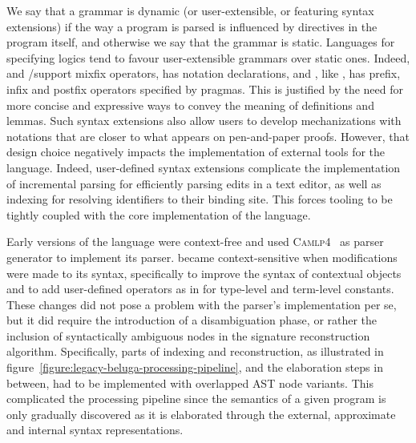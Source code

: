 We say that a grammar is dynamic (or user-extensible, or featuring syntax extensions) if the way a program is parsed is influenced by directives in the program itself, and otherwise we say that the grammar is static.
Languages for specifying logics tend to favour user-extensible grammars over static ones.
Indeed, \Agda and \Isabelle/\HOL support mixfix operators, \Coq has notation declarations, and \Beluga, like \Twelf, has prefix, infix and postfix operators specified by pragmas.
This is justified by the need for more concise and expressive ways to convey the meaning of definitions and lemmas.
Such syntax extensions also allow users to develop mechanizations with notations that are closer to what appears on pen-and-paper proofs.
However, that design choice negatively impacts the implementation of external tools for the language.
Indeed, user-defined syntax extensions complicate the implementation of incremental parsing for efficiently parsing edits in a text editor, as well as indexing for resolving identifiers to their binding site.
This forces tooling to be tightly coupled with the core implementation of the language.

Early versions of the \Beluga language were context-free and used \textsc{Camlp4}~\cite{de2003camlp4} as parser generator to implement its parser.
\Beluga became context-sensitive when modifications were made to its syntax, specifically to improve the syntax of contextual objects and to add user-defined operators as in \Twelf for \LF type-level and term-level constants.
These changes did not pose a problem with the parser's implementation per se, but it did require the introduction of a disambiguation phase, or rather the inclusion of syntactically ambiguous nodes in the signature reconstruction algorithm.
Specifically, parts of indexing and reconstruction, as illustrated in figure~\ref{figure:legacy-beluga-processing-pipeline}, and the elaboration steps in between, had to be implemented with overlapped \ac{AST} node variants.
This complicated the processing pipeline since the semantics of a given \Beluga program is only gradually discovered as it is elaborated through the external, approximate and internal syntax representations.


